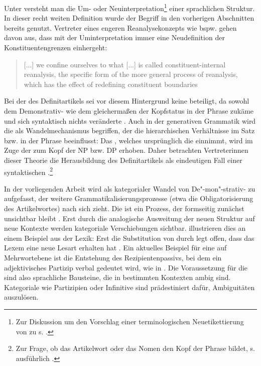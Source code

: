 Unter  versteht man die Um- oder Neuinterpretation\footnote{Zur Diskussion um den Vorschlag einer terminologischen Neuetikettierung von  zu  s.  \textcite[36]{Traugott2013}.} einer sprachlichen Struktur. In dieser recht weiten Definition wurde der Begriff in den vorherigen Abschnitten bereits genutzt. Vertreter eines engeren Reanalysekonzepts  wie bspw. \textcite[215]{Heine1991} gehen davon aus, dass mit der Uminterpretation immer eine Neudefinition der Konstituentengrenzen einhergeht: \blockcquote[216]{Heine1991}{[...] we confine ourselves to what [...] is called constituent-internal reanalysis, the specific form of the more general process of reanalysis, which has the effect of redefining constituent boundaries}. Bei der  des Definitartikels sei vor diesem Hintergrund keine   beteiligt, da sowohl dem Demonstrativ-  wie dem  gleichermaßen der Kopfstatus in der Phrase zukäme und sich syntaktisch nichts veränderte \parencite[219]{Heine1991}. Auch in der generativen Grammatik wird die  als Wandelmechanismus begriffen, der die hierarchischen Verhältnisse im Satz bzw. in der Phrase beeinflusst: Das , welches ursprünglich die  einnimmt, wird im Zuge der  zum Kopf der NP bzw. DP erhoben. Daher betrachten Vertreterinnen dieser Theorie die Herausbildung des Definitartikels als eindeutigen Fall einer syntaktischen  \parencite[vgl. bspw.][]{Philippi1997,vanGelderen2007}.\footnote{Zur Frage, ob das Artikelwort oder das Nomen den Kopf der Phrase bildet, s. ausführlich \textcite[145--146]{Himmelmann1997}.}

In der vorliegenden Arbeit wird  als kategorialer Wandel von De"-mon"-strativ- zu  aufgefasst, der weitere Grammatikalisierungsprozesse  (etwa die Obligatorisierung des Artikelwortes) nach sich zieht. Die  ist ein Prozess, der formseitig zunächst unsichtbar bleibt \parencite[58]{Langacker1977}. Erst durch die analogische  Ausweitung der neuen Struktur auf neue Kontexte werden kategoriale Verschiebungen sichtbar. \textcite[50]{Hopper2006} illustrieren dies an einem Beispiel aus der Lexik: Erst die Substitution von  durch  legt offen, dass das Lexem  eine neue Lesart erhalten hat \parencite[urspr. ][389]{Kluge2011}. Ein aktuelles Beispiel für eine  auf Mehrwortebene ist die Entstehung des Rezipientenpassivs, bei dem ein adjektivisches Partizip verbal gedeutet wird, wie in  \parencite[152--153]{Szczepaniak2011a}.
Die Voraussetzung für die  sind also sprachliche Bausteine, die in bestimmten Kontexten ambig sind. Kategoriale  wie Partizipien oder Infinitive \parencite[vgl. die  des -Progressivs: Aus einem nominalen wird ein verbaler Infinitiv, s.][]{Flick2013} sind prädestiniert dafür, Ambiguitäten auszulösen. 

